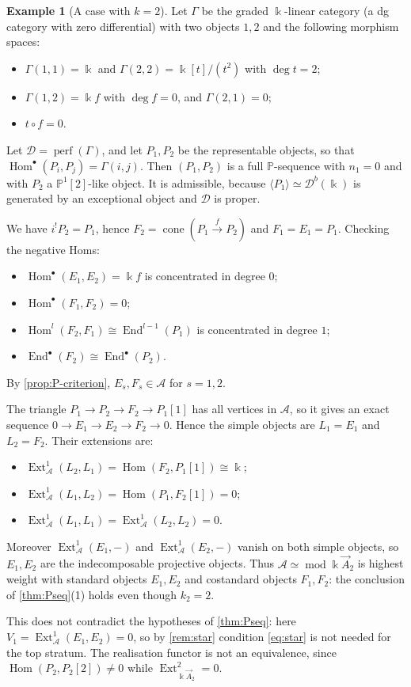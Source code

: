 \documentclass[11pt,reqno]{amsart}
\theoremstyle{plain}
\theoremstyle{definition}
\newtheorem{example}[theorem]{Example}
\theoremstyle{remark}
\newcommand{\kk}{\Bbbk}
\DeclareMathOperator{\Hom}{Hom}
\DeclareMathOperator{\End}{End}
\DeclareMathOperator{\Ext}{Ext}
\DeclareMathOperator{\cone}{cone}
\newcommand{\modd}{\operatorname{mod}}
\newcommand{\Db}{\mathcal{D}^b}
\newcommand{\thick}[1]{\langle #1\rangle}
\newcommand{\Pn}[2]{\mathbb{P}^{#1}[#2]}
\newcommand{\cD}{\mathcal{D}}
\newcommand{\cA}{\mathcal{A}}
\begin{document}
\begin{example}[A case with $k=2$]\label{ex:k2}
Let $\Gamma$ be the graded $\kk$-linear category (a dg category with zero differential) with two objects $1,2$ and the following morphism spaces:
\begin{itemize}
\item $\Gamma(1,1)=\kk$ and $\Gamma(2,2)=\kk[t]/(t^2)$ with $\deg t=2$;
\item $\Gamma(1,2)=\kk f$ with $\deg f=0$, and $\Gamma(2,1)=0$;
\item $t\circ f=0$.
\end{itemize}
Let $\cD=\operatorname{perf}(\Gamma)$, and let $P_1,P_2$ be the representable objects, so that $\Hom^\bullet(P_i,P_j)=\Gamma(i,j)$. Then $(P_1,P_2)$ is a full $\mathbb{P}$-sequence with $n_1=0$ and with $P_2$ a $\Pn12$-like object. It is admissible, because $\thick{P_1}\simeq\Db(\kk)$ is generated by an exceptional object and $\cD$ is proper.

We have $i^!P_2=P_1$, hence $F_2=\cone(P_1\xrightarrow{f}P_2)$ and $F_1=E_1=P_1$. Checking the negative Homs:
\begin{itemize}
\item $\Hom^\bullet(E_1,E_2)=\kk f$ is concentrated in degree $0$;
\item $\Hom^\bullet(F_1,F_2)=0$;
\item $\Hom^l(F_2,F_1)\cong\End^{l-1}(P_1)$ is concentrated in degree $1$;
\item $\End^\bullet(F_2)\cong\End^\bullet(P_2)$.
\end{itemize}
By \cref{prop:P-criterion}, $E_s,F_s\in\cA$ for $s=1,2$.

The triangle $P_1\to P_2\to F_2\to P_1[1]$ has all vertices in $\cA$, so it gives an exact sequence $0\to E_1\to E_2\to F_2\to0$. Hence the simple objects are $L_1=E_1$ and $L_2=F_2$. Their extensions are:
\begin{itemize}
\item $\Ext^1_\cA(L_2,L_1)=\Hom(F_2,P_1[1])\cong\kk$;
\item $\Ext^1_\cA(L_1,L_2)=\Hom(P_1,F_2[1])=0$;
\item $\Ext^1_\cA(L_1,L_1)=\Ext^1_\cA(L_2,L_2)=0$.
\end{itemize}
Moreover $\Ext^1_\cA(E_1,-)$ and $\Ext^1_\cA(E_2,-)$ vanish on both simple objects, so $E_1,E_2$ are the indecomposable projective objects. Thus $\cA\simeq\modd\kk\vec A_2$ is highest weight with standard objects $E_1,E_2$ and costandard objects $F_1,F_2$: the conclusion of \cref{thm:Pseq}(1) holds even though $k_2=2$.

This does not contradict the hypotheses of \cref{thm:Pseq}: here $V_1=\Ext^1_\cA(E_1,E_2)=0$, so by \cref{rem:star} condition \eqref{eq:star} is not needed for the top stratum. The realisation functor is not an equivalence, since $\Hom(P_2,P_2[2])\ne0$ while $\Ext^2_{\kk\vec A_2}=0$.
\end{example}
\end{document}
